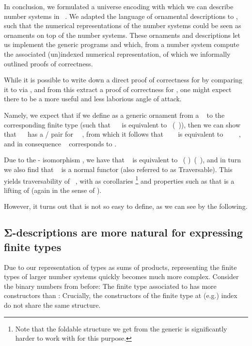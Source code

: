 In conclusion, we formulated a universe encoding  with which we can describe number systems in \ . We adapted the language of ornamental descriptions  to , such that the numerical representations of the number systems could be seen as ornaments on top of the number systems. These ornaments and descriptions let us implement the generic programs  and  which, from a number system compute the associated (un)indexed numerical representation, of which we informally outlined proofs of correctness. 

While it is possible to write down a direct proof of correctness for  by comparing it to  via , and from this extract a proof of correctness for , one might expect there to be a more useful and less laborious angle of attack. 

Namely, we expect that if we define  as a generic ornament from a \  to the corresponding finite type (such that \ \  is equivalent to \ (\ )), then we can show that \ \  has a / pair for \ \ , from which it follows that \ \ \  is equivalent to \ \ \ \ , and in consequence \  corresponds to .

Due to the - isomorphism \cite{algorn}, we have that \  is equivalent to \ ( )\ (\ ), and in turn we also find that \  is a normal functor (also referred to as Traversable). This yields traversability of \ , with as corollaries \footnote{Note that the foldable structure we get from the generic  is significantly harder to work with for this purpose.} and properties such as that  is a lifting of  (again in the sense of \cite{orntrans}).

However, it turns out that  is not so easy to define, as we can see by the following.

\subsection{Σ-descriptions are more natural for expressing finite types}\label{sec:sigma-desc}
Due to our representation of types as sums of products, representing the finite types of larger number systems quickly becomes much more complex. Consider the binary numbers from before:
The finite type associated to  has more constructors than :
Crucially, the constructors of the finite type at (e.g.) index \  do not share the same structure.

